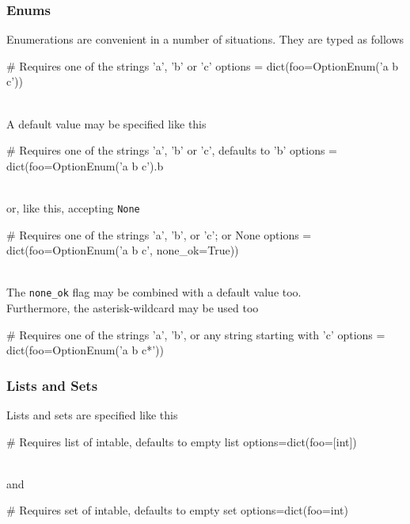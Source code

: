 \subsubsection*{Enums}
Enumerations are convenient in a number of situations.  They are typed
as follows
\\
\begin{pythonBEG}
  # Requires one of the strings 'a', 'b' or 'c'
  options = dict(foo=OptionEnum('a b c'))
\end{pythonBEG}
\\
A default value may be specified like this
\\
\begin{pythonMID}
   # Requires one of the strings 'a', 'b' or 'c', defaults to 'b'
  options = dict(foo=OptionEnum('a b c').b
\end{pythonMID}
\\
or, like this, accepting \texttt{None}
\\
\begin{pythonMID}
  # Requires one of the strings 'a', 'b', or 'c'; or None
  options = dict(foo=OptionEnum('a b c', none_ok=True))
\end{pythonMID}
\\
The \texttt{none\_ok} flag may be combined with a default value too.
\\
Furthermore, the asterisk-wildcard may be used too
\\
\begin{pythonEND}
  # Requires one of the strings 'a', 'b', or any string starting with 'c'
  options = dict(foo=OptionEnum('a b c*'))
\end{pythonEND}



\subsubsection*{Lists and Sets}
Lists and sets are specified like this
\\
\begin{pythonBEG}
  # Requires list of intable, defaults to empty list
  options=dict(foo=[int])
\end{pythonBEG}
\\
and
\\
\begin{pythonEND}
  # Requires set of intable, defaults to empty set
  options=dict(foo={int})
\end{pythonEND}



